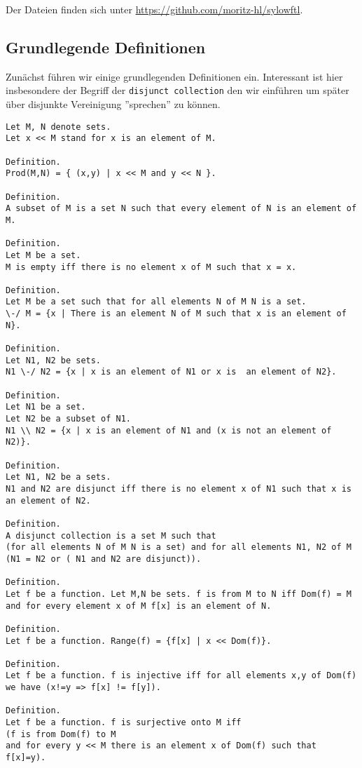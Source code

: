 \documentclass[a4paper,12pt]{scrartcl}
\begin{document}
Der Dateien finden sich unter \url{https://github.com/moritz-hl/sylowftl}.

\subsection{Grundlegende Definitionen}

Zunächst führen wir einige grundlegenden Definitionen ein.
Interessant ist hier insbesondere der Begriff der \verb!disjunct collection! den wir einführen um später über disjunkte Vereinigung ''sprechen'' zu können.

\begin{lstlisting}
Let M, N denote sets.
Let x << M stand for x is an element of M.

Definition.
Prod(M,N) = { (x,y) | x << M and y << N }.

Definition.
A subset of M is a set N such that every element of N is an element of M.

Definition.
Let M be a set.
M is empty iff there is no element x of M such that x = x.

Definition.
Let M be a set such that for all elements N of M N is a set.
\-/ M = {x | There is an element N of M such that x is an element of N}.

Definition.
Let N1, N2 be sets.
N1 \-/ N2 = {x | x is an element of N1 or x is  an element of N2}.

Definition.
Let N1 be a set.
Let N2 be a subset of N1.
N1 \\ N2 = {x | x is an element of N1 and (x is not an element of N2)}.

Definition.
Let N1, N2 be a sets.
N1 and N2 are disjunct iff there is no element x of N1 such that x is an element of N2.

Definition.
A disjunct collection is a set M such that 
(for all elements N of M N is a set) and for all elements N1, N2 of M (N1 = N2 or ( N1 and N2 are disjunct)).

Definition.
Let f be a function. Let M,N be sets. f is from M to N iff Dom(f) = M and for every element x of M f[x] is an element of N.

Definition.
Let f be a function. Range(f) = {f[x] | x << Dom(f)}.

Definition.
Let f be a function. f is injective iff for all elements x,y of Dom(f) we have (x!=y => f[x] != f[y]).

Definition.
Let f be a function. f is surjective onto M iff 
(f is from Dom(f) to M 
and for every y << M there is an element x of Dom(f) such that f[x]=y).
\end{lstlisting}
\end{document}

